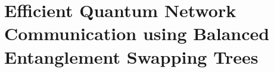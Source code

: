 \chapter[Efficient Quantum Network Communication using Balanced Entanglement Swapping Trees]{Efficient Quantum Network Communication using Balanced Entanglement Swapping Trees}
\label{chap:tqe}


              


% 

%  
% 



%     
